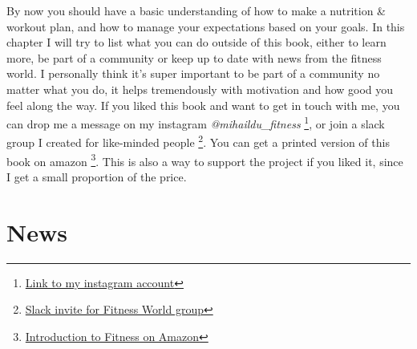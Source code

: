\documentclass[openany, 12pt]{book}
\begin{document}
  By now you should have a basic understanding of how to make a nutrition \& workout plan, and how to manage your expectations based on your goals. In this chapter I will try to
  list what you can do outside of this book, either to learn more, be part of a community or keep up to date with news from the fitness world. I personally think it's super important
  to be part of a community no matter what you do, it helps tremendously with motivation and how good you feel along the way. If you liked this book and want to get in touch with me,
  you can drop me a message on my instagram \textit{@mihaildu\_fitness}
  \footnote{\href{https://www.instagram.com/mihaildu_fitness/}{Link to my instagram account}}, or join a slack group I created for like-minded people
  \footnote{\href{https://join.slack.com/t/fitness-world-group/shared_invite/zt-1bhw1fakw-X5vr_m1DwEv2tAelIcWj1w}{Slack invite for Fitness World group}}. You can get a printed version of this
  book on amazon
  \footnote{\href{https://www.amazon.com/dp/B0B4DQF9HJ}{Introduction to Fitness on Amazon}}. This is also a way to support the project if you liked it, since I get a small proportion of the price.

  	\section{News}
\end{document}

